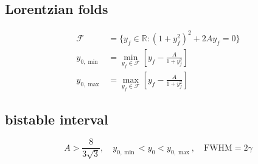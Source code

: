 \subsection*{Lorentzian folds}
\[
\displaystyle \begin{aligned}\mathcal F&=\{y_f\in\mathbb R:(1+y_f^2)^2+2Ay_f=0\}\\y_{0,\min}&=\min_{y_f\in\mathcal F}\left[y_f-\frac A{1+y_f^2}\right]\\y_{0,\max}&=\max_{y_f\in\mathcal F}\left[y_f-\frac A{1+y_f^2}\right]\end{aligned}
\]

\subsection*{bistable interval}
\[
\displaystyle A>\frac{8}{3\sqrt3},\quad y_{0,\min}<y_0<y_{0,\max},\quad\mathrm{FWHM}=2\gamma
\]
